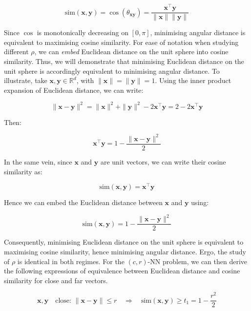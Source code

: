 \documentclass{article}
\newcommand{\Rd}{\mathbb{R}^d}
\newcommand{\bx}{\mathbf{x}}
\newcommand{\by}{\mathbf{y}}
\newcommand{\cosim}{\mathrm{sim}}
\newcommand{\crNN}{$(c, r)$-NN\xspace}
\newcommand{\dotxy}{\bx^\top \by}
\newcommand{\nbx}{\| \bx \|}
\newcommand{\nby}{\| \by \|}
\begin{document}
\begin{equation}
    \cosim(\bx, \by) = \cos(\theta_{\bx \by}) = \frac{\bx^\top \by}{\nbx \nby}
\end{equation}

Since $\cos$ is monotonically decreasing on $[0, \pi]$, minimising angular distance is equivalent to maximising cosine similarity. For ease of notation when studying different $\rho$, we can \emph{embed} Euclidean distance on the unit sphere into cosine similarity. Thus, we will demonstrate that minimising Euclidean distance on the unit sphere is accordingly equivalent to minimising angular distance. To illustrate, take $\bx, \by \in \Rd$, with $\|\bx\|=\|\by\|=1$. Using the inner product expansion of Euclidean distance, we can write:

\begin{equation}
    \|\bx-\by\|^2 = \|\bx\|^2 + \|\by\|^2 - 2 \dotxy = 2 - 2\dotxy
\end{equation}

Then:

\begin{equation}
    \bx^\top \by = 1 - \frac{ \|\bx-\by\|^2}{2}
\end{equation}

In the same vein, since $\bx$ and $\by$ are unit vectors, we can write their cosine similarity as:

\begin{equation}
    \cosim(\bx, \by) = \dotxy
\end{equation}

Hence we can embed the Euclidean distance between $\bx$ and $\by$ using: 

\begin{equation}
    \cosim(\bx, \by) = 1 - \frac{\|\bx-\by\|^2}{2}
\end{equation}

Consequently, minimising Euclidean distance on the unit sphere is equivalent to maximising cosine similarity, hence minimising angular distance. Ergo, the study of $\rho$ is identical in both regimes. For the \crNN problem, we can then derive the following expressions of equivalence between Euclidean distance and cosine similarity for close and far vectors. 

\begin{equation}
    \label{eq:lsh-t1}
    \bx, \by \quad \text{close: } \|\bx-\by\| \le r
    \quad\Rightarrow\quad \cosim(\bx, \by) \ge t_1 = 1 - \frac{r^2}{2} 
\end{equation}
\end{document}
